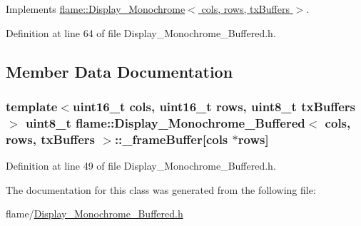 Implements \hyperlink{classflame_1_1_display___monochrome_a34002efa6fccb74a4fbea455f2a261d3}{flame\-::\-Display\-\_\-\-Monochrome$<$ cols, rows, tx\-Buffers $>$}.



Definition at line 64 of file Display\-\_\-\-Monochrome\-\_\-\-Buffered.\-h.



\subsection{Member Data Documentation}
\hypertarget{classflame_1_1_display___monochrome___buffered_ad1811b000b6d38a4400da0784768544c}{
\subsubsection[{\-\_\-frame\-Buffer}]{\setlength{\rightskip}{0pt plus 5cm}template$<$uint16\-\_\-t cols, uint16\-\_\-t rows, uint8\-\_\-t tx\-Buffers$>$ uint8\-\_\-t {\bf flame\-::\-Display\-\_\-\-Monochrome\-\_\-\-Buffered}$<$ cols, rows, tx\-Buffers $>$\-::\-\_\-frame\-Buffer\mbox{[}cols $\ast$rows\mbox{]}\hspace{0.3cm}{\ttfamily [protected]}}}\label{classflame_1_1_display___monochrome___buffered_ad1811b000b6d38a4400da0784768544c}


Definition at line 49 of file Display\-\_\-\-Monochrome\-\_\-\-Buffered.\-h.



The documentation for this class was generated from the following file\-:\begin{DoxyCompactItemize}
\item 
flame/\hyperlink{_display___monochrome___buffered_8h}{Display\-\_\-\-Monochrome\-\_\-\-Buffered.\-h}\end{DoxyCompactItemize}
